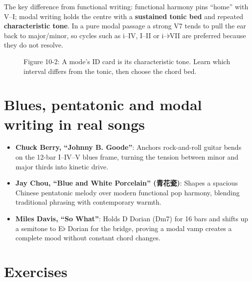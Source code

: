 The key difference from functional writing: functional harmony pins ``home'' with V--I; modal writing holds the centre with a \textbf{sustained tonic bed} and repeated \textbf{characteristic tone}. In a pure modal passage a strong V7 tends to pull the ear back to major/minor, so cycles such as i--IV, I--II or i--\(\flat\)VII are preferred because they do not resolve.

\begin{figure}[htbp]
\centering
{}
\caption*{Figure 10-2: A mode's ID card is its characteristic tone. Learn which interval differs from the tonic, then choose the chord bed.}
\end{figure}

\section{Blues, pentatonic and modal writing in real songs}

\begin{itemize}
  \item \textbf{Chuck Berry, ``Johnny B. Goode''}: Anchors rock-and-roll guitar bends on the 12-bar I--IV--V blues frame, turning the tension between minor and major thirds into kinetic drive.
  \item \textbf{Jay Chou, ``Blue and White Porcelain'' (青花瓷)}: Shapes a spacious Chinese pentatonic melody over modern functional pop harmony, blending traditional phrasing with contemporary warmth.
  \item \textbf{Miles Davis, ``So What''}: Holds D Dorian (Dm7) for 16 bars and shifts up a semitone to E$\flat$ Dorian for the bridge, proving a modal vamp creates a complete mood without constant chord changes.
\end{itemize}

\section{Exercises}

